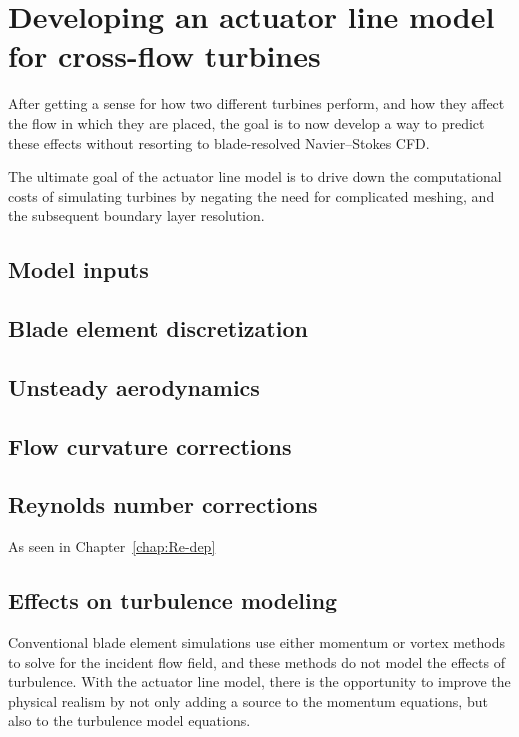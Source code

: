 \chapter{Developing an actuator line model for cross-flow turbines}

After getting a sense for how two different turbines perform, and how they
affect the flow in which they are placed, the goal is to now develop a way to
predict these effects without resorting to blade-resolved Navier--Stokes CFD.

The ultimate goal of the actuator line model is to drive down the computational
costs of simulating turbines by negating the need for complicated meshing, and
the subsequent boundary layer resolution.

\section{Model inputs}


\section{Blade element discretization}

\section{Unsteady aerodynamics}

\section{Flow curvature corrections}

\section{Reynolds number corrections}
As seen in Chapter~\ref{chap:Re-dep}

\section{Effects on turbulence modeling}

Conventional blade element simulations use either momentum or vortex methods to
solve for the incident flow field, and these methods do not model the effects of
turbulence. With the actuator line model, there is the opportunity to improve
the physical realism by not only adding a source to the momentum equations, but
also to the turbulence model equations.

